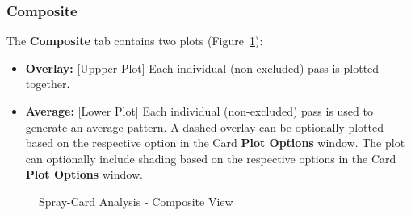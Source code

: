 \documentclass[10pt,letterpaper,titlepage]{article}
\begin{document}
    \subsubsection{Composite}
    The \textbf{Composite} tab contains two plots (Figure~\ref{fig:card_composite}):
    \begin{itemize}
        \item \textbf{Overlay:} [Uppper Plot] Each individual (non-excluded) pass is plotted together.
        \item \textbf{Average:} [Lower Plot] Each individual (non-excluded) pass is used to generate an average pattern.  A dashed overlay can be optionally plotted based on the respective option in the Card \textbf{Plot Options} window. The plot can optionally include shading based on the respective options in the Card \textbf{Plot Options} window.
    \end{itemize}
    \begin{figure}[hb]
        \centering
        \caption{Spray-Card Analysis - Composite View}
        \label{fig:card_composite}
    \end{figure}
    \FloatBarrier
    \newpage
\end{document}
